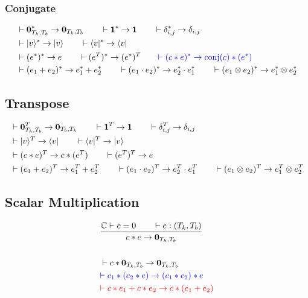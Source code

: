 
\subsubsection*{Conjugate}
\begin{align*}
  & \vdash \textbf{0}_{T_k, T_b}^* \to \textbf{0}_{T_k, T_b} 
  \qquad \vdash \mathbf{1}^* \to \mathbf{1}
  \qquad \vdash \delta_{i,j}^* \to \delta_{i,j}\\
  & \vdash |v\rangle^* \to |v\rangle 
  \qquad \vdash \langle v|^* \to \langle v| \\
  & \vdash (e^*)^*\to e
  \qquad \vdash (e^T)^* \to (e^*)^T
  \qquad \textcolor{blue}{\vdash (c * e)^* \to \textrm{conj}(c) * (e^*)}\\
  & \vdash (e_1 + e_2)^* \to e_1^* + e_2^* \qquad \vdash (e_1 \cdot e_2)^* \to e_2^* \cdot e_1^* \qquad \vdash (e_1 \otimes e_2)^* \to e_1^* \otimes e_2^*
\end{align*}

\subsection*{Transpose}
\begin{align*}
  & \vdash \textbf{0}_{T_k, T_b}^T \to \textbf{0}_{T_b, T_k} 
  \qquad \vdash \mathbf{1}^T \to \mathbf{1}
  \qquad \vdash \delta_{i,j}^T \to \delta_{i,j} \\
  & \vdash |v\rangle^T \to \langle v| 
  \qquad \vdash \langle v|^T \to |v\rangle \\
  & \vdash (c * e)^T \to c * (e^T)
  \qquad \vdash (e^T)^T \to e\\
  & \vdash (e_1 + e_2)^T \to e_1^T + e_2^T \qquad \vdash (e_1 \cdot e_2)^T \to e_2^T \cdot e_1^T \qquad \vdash (e_1 \otimes e_2)^T \to e_1^T \otimes e_2^T
\end{align*}

\subsection*{Scalar Multiplication}
\begin{align*}
  & \frac{\mathbb{C} \vdash c = 0 \qquad \vdash e : (T_k, T_b)}{c * e \to \textbf{0}_{T_k, T_b}}\\
  &\ \\
  & \vdash c * \mathbf{0}_{T_k, T_b} \to \mathbf{0}_{T_k, T_b} \\
  & \textcolor{blue}{\vdash c_1 * (c_2 * e) \to (c_1 * c_2) * e} \\
  & \textcolor{red}{\vdash c * e_1 + c * e_2 \to c * (e_1 + e_2)}
\end{align*}

